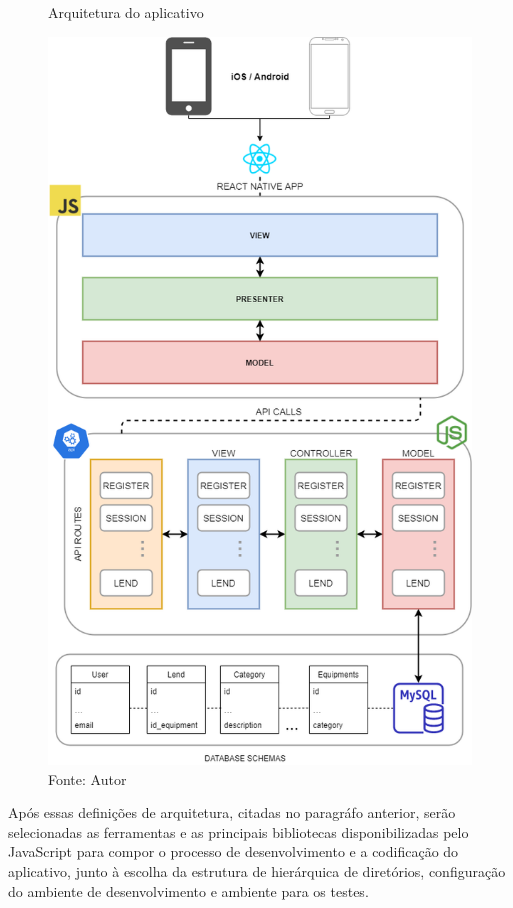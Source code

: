     \begin{figure}[h]
    \caption{Arquitetura do aplicativo}
    \centering %
    \includegraphics[width=12cm]{imagem/jubilant-octo-lab.png}
    \caption*{Fonte: Autor}
    \label{figura:lab-architecture}
    \end{figure}
    
    \clearpage
    
    Após essas definições de arquitetura, citadas no paragráfo anterior, serão selecionadas as ferramentas e as principais bibliotecas disponibilizadas pelo JavaScript para compor o processo de desenvolvimento e a codificação do aplicativo, junto à escolha da estrutura de hierárquica de diretórios, configuração do ambiente de desenvolvimento e ambiente para os testes.
    
